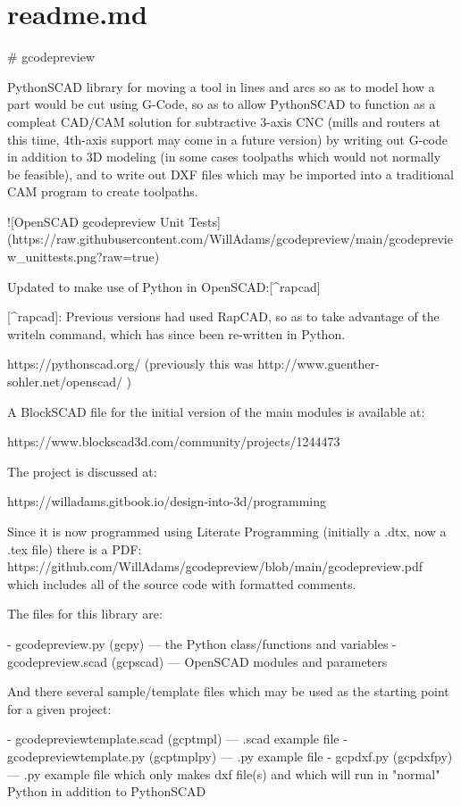 \documentclass{ltxdoc}
\begin{document}
\clearpage
\section{readme.md}

\begin{readme}
# gcodepreview

PythonSCAD library for moving a tool in lines and arcs so as to model how a part would be cut using G-Code, so as to allow PythonSCAD to function as a compleat CAD/CAM solution for subtractive 3-axis CNC (mills and routers at this time, 4th-axis support may come in a future version) by writing out G-code in addition to 3D modeling (in some cases toolpaths which would not normally be feasible), and to write out DXF files which may be imported into a traditional CAM program to create toolpaths. 

![OpenSCAD gcodepreview Unit Tests](https://raw.githubusercontent.com/WillAdams/gcodepreview/main/gcodepreview_unittests.png?raw=true)

Updated to make use of Python in OpenSCAD:[^rapcad]

[^rapcad]: Previous versions had used RapCAD, so as to take advantage of the writeln command, which has since been re-written in Python.

https://pythonscad.org/ (previously this was http://www.guenther-sohler.net/openscad/ )

A BlockSCAD file for the initial version of the 
main modules is available at:

https://www.blockscad3d.com/community/projects/1244473

The project is discussed at:

https://willadams.gitbook.io/design-into-3d/programming

Since it is now programmed using Literate Programming (initially a .dtx, now a .tex file) there is a PDF: https://github.com/WillAdams/gcodepreview/blob/main/gcodepreview.pdf which includes all of the source code with formatted comments.

The files for this library are:

 - gcodepreview.py (gcpy) --- the Python class/functions and variables
 - gcodepreview.scad (gcpscad) --- OpenSCAD modules and parameters

And there several sample/template files which may be used as the starting point for a given project:

 - gcodepreviewtemplate.scad (gcptmpl) --- .scad example file
 - gcodepreviewtemplate.py (gcptmplpy) --- .py example file 
 - gcpdxf.py (gcpdxfpy) --- .py example file which only makes dxf file(s) and which will run in "normal" Python in addition to PythonSCAD


\end{readme}
\end{document}
